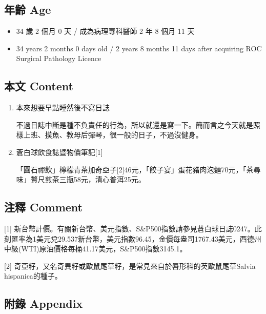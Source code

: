 \documentclass[a5paper, 11pt
]{book}
\providecommand{\tightlist}{%
  \setlength{\itemsep}{0pt}\setlength{\parskip}{0pt}}
\begin{document}
\hypertarget{ux5e74ux9f61-age-20}{%
\subsection{年齡 Age}\label{ux5e74ux9f61-age-20}}

\begin{itemize}
\tightlist
\item
  34 歲 2 個月 0 天 / 成為病理專科醫師 2 年 8 個月 11 天
\item
  34 years 2 months 0 days old / 2 years 8 months 11 days after
  acquiring ROC Surgical Pathology Licence
\end{itemize}

\hypertarget{ux672cux6587-content-20}{%
\subsection{本文 Content}\label{ux672cux6587-content-20}}

\begin{enumerate}
\def\labelenumi{\arabic{enumi}.}
\item
  本來想要早點睡然後不寫日誌

  不過日誌中斷是種不負責任的行為，所以就還是寫一下。簡而言之今天就是照樣上班、摸魚、教母后彈琴，很一般的日子，不過沒健身。
\item
  蒼白球飲食誌暨物價筆記{[}1{]}

  「圓石禪飲」檸檬青茶加奇亞子{[}2{]}46元，「餃子宴」蛋花豬肉泡麵70元，「茶尋味」贅尺煎茶三瓶58元，清心普洱25元。
\end{enumerate}

\hypertarget{ux6ce8ux91cb-comment-20}{%
\subsection{注釋 Comment}\label{ux6ce8ux91cb-comment-20}}

{[}1{]}
新台幣計價。有關新台幣、美元指數、S\&P500指數請參見蒼白球日誌0247。此刻匯率為1美元兌29.537新台幣，美元指數96.45，金價每盎司1767.43美元，西德州中級(WTI)原油價格每桶41.17美元，S\&P500指數3145.1。

{[}2{]}
奇亞籽，又名奇異籽或歐鼠尾草籽，是常見來自於唇形科的芡歐鼠尾草Salvia
hispanica的種子。

\hypertarget{ux9644ux9304-appendix-20}{%
\subsection{附錄 Appendix}\label{ux9644ux9304-appendix-20}}
\end{document}
